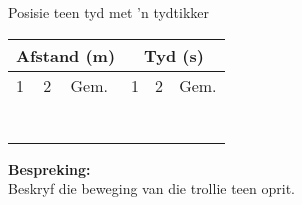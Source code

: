 \begin{f_experiment}{Posisie teen tyd met 'n tydtikker}
\begin{table}[H]
\begin{center}
      \label{m38795*id7141349}
      \begin{tabular}{|l|l|l|l|l|l|}\hline
    \multicolumn{3}{|c|}{Afstand (m)}
     &
    \multicolumn{3}{c|}{Tyd (s)}
     \\ \hline
        1 &
        2 &
        Gem. &
        1 &
        2 &
        Gem. \\ \hline
         &
         &
         &
         &
         &
      \\ \hline
         &
         &
         &
         &
         &
       \\ \hline
         &
         &
         &
         &
         &
       \\ \hline
         &
         &
         &
         &
         &
        \\ \hline
         &
         &
         &
         &
         &
        \\ \hline
         &
         &
         &
         &
         &
       \\ \hline
         &
         &
         &
         &
         &
      \\ \hline
    \end{tabular}
      \end{center}
\end{table}
    \par
\textbf{Bespreking:}\\
Beskryf die beweging van die trollie teen oprit.
\end{f_experiment}

